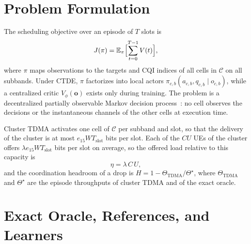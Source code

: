 \documentclass{ieeeaccess}
\begin{document}
\section{Problem Formulation}
\label{sec:problem}
The scheduling objective over an episode of $T$ slots is
\begin{equation}
J(\pi) = \mathbb{E}_{\pi}\Bigl[\sum_{t=0}^{T-1} V(t)\Bigr],
\label{eq:objective}
\end{equation}
where $\pi$ maps observations to the targets and CQI indices of all cells in $\mathcal{C}$ on all subbands. Under CTDE, $\pi$ factorizes into local actors $\pi_{c,b}(a_{c,b}, q_{c,b} \mid o_{c,b})$, while a centralized critic $V_\phi(\mathbf{o})$ exists only during training. The problem is a decentralized partially observable Markov decision process~\cite{oliehoek2016dec}: no cell observes the decisions or the instantaneous channels of the other cells at execution time.

Cluster TDMA activates one cell of $\mathcal{C}$ per subband and slot, so that the delivery of the cluster is at most $e_{15} W T_{\text{slot}}$ bits per slot. Each of the $C U$ UEs of the cluster offers $\lambda e_{15} W T_{\text{slot}}$ bits per slot on average, so the offered load relative to this capacity is
\begin{equation}
\eta = \lambda\, C\, U,
\label{eq:offered_load}
\end{equation}
and the coordination headroom of a drop is $H = 1 - \Theta_{\text{TDMA}}/\Theta^{\star}$, where $\Theta_{\text{TDMA}}$ and $\Theta^{\star}$ are the episode throughputs of cluster TDMA and of the exact oracle.

\section{Exact Oracle, References, and Learners}
\label{sec:method}
\end{document}
